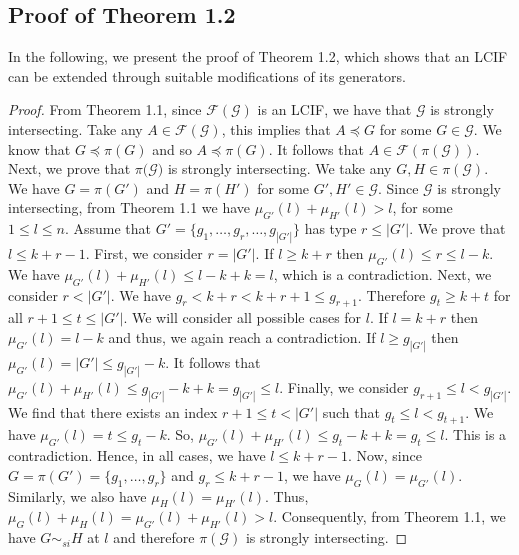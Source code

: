 \documentclass[reqno,english]{amsart}
\theoremstyle{plain}
\theoremstyle{remark}
\newcommand{\0}[0]{\emptyset}
\renewcommand{\1}[0]{\textbf{1}}
\theoremstyle{plain}
\theoremstyle{remark}
\renewcommand{\1}[0]{\textbf{1}}
\begin{document}
\subsection{ Proof of Theorem 1.2}
 In the following, we present the proof of Theorem 1.2, which shows that an LCIF can be extended through suitable modifications of its generators.
\begin{proof} From Theorem 1.1, since $\mathcal{F}(\mathcal{G})$ is an LCIF, we have that $\mathcal{G}$ is strongly intersecting. Take any $A \in \mathcal{F}(\mathcal{G})$, this implies that $A \preceq G$ for some $G \in \mathcal{G}$. We know that $G \preceq \pi(G)$ and so $A \preceq \pi(G)$. It follows that $A \in \mathcal{F}(\pi(\mathcal{G}))$. Next, we prove that $\mathcal{\pi(\mathcal{G}})$ is strongly intersecting. We take any $G,H \in \pi(\mathcal{G})$. We have $G=\pi(G')$ and $H=\pi(H')$ for some $G', H' \in \mathcal{G}$. Since $\mathcal{G}$ is strongly intersecting, from Theorem 1.1 we have $\mu_{G'}(l)+\mu_{H'}(l) > l$, for some $1 \leq l \leq n$. Assume that $G'=\{g_{1},\ldots,g_{r},\ldots,g_{|G'|}\}$ has type $r \leq |G'|$. We prove that $l \leq k+r-1$. First, we consider $r=|G'|$. If $l \geq k+r$ then $\mu_{G'}(l) \leq r \leq l-k$. We have $\mu_{G'}(l)+\mu_{H'}(l) \leq l-k+k=l$, which is a contradiction. Next, we consider $r <|G'|$. We have $g_{r} < k+r <k+r+1 \leq g_{r+1}$. Therefore $g_{t} \geq k+t$ for all $r+1 \leq t \leq |G'|$. We will consider all possible cases for $l$. If $l=k+r$ then $\mu_{G'}(l)=l-k$ and thus, we again reach a contradiction. If $l \geq g_{|G'|}$ then $\mu_{G'}(l)=|G'| \leq g_{|G'|}-k$. It follows that $\mu_{G'}(l)+\mu_{H'}(l) \leq g_{|G'|} -k +k = g_{|G'|} \leq l$. Finally, we consider $g_{r+1} \leq l < g_{|G'|}$. We find that there exists an index $r+1 \leq t < |G'|$ such that $g_{t} \leq l < g_{t+1}$. We have $\mu_{G'}(l) =t \leq g_{t}-k$. So, $\mu_{G'}(l)+\mu_{H'}(l) \leq g_{t}-k+k=g_{t} \leq l$. This is a contradiction. Hence, in all cases, we have $l \leq k+r-1$. Now, since $G=\pi(G')=\{g_{1},\ldots,g_{r}\}$ and $g_{r} \leq k+r-1$, we have $\mu_{G}(l)=\mu_{G'}(l)$. Similarly, we also have $\mu_{H}(l)=\mu_{H'}(l)$. Thus, $\mu_{G}(l)+\mu_{H}(l)=\mu_{G'}(l)+\mu_{H'}(l) >l$. Consequently, from Theorem 1.1, we have $G \sim_{si} H$ at $l$ and therefore $\pi(\mathcal{G})$ is strongly intersecting.
\end{proof}
    
\end{document}
